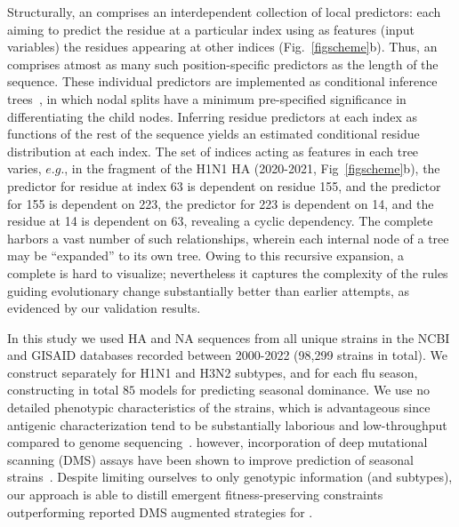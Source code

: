 \documentclass[onecolumn, compsoc,10pt]{IEEEtran}
\begin{document}
Structurally, an \enet comprises an interdependent collection of  local predictors: each aiming to predict the  residue at a particular index  using as features (input variables) the residues appearing  at other  indices  (Fig.~\ref{figscheme}b). Thus,  an \enet comprises atmost as many such  position-specific predictors as the length of the sequence. These individual predictors are implemented as conditional inference trees~\cite{Hothorn06unbiasedrecursive}, in which  nodal splits  have  a minimum pre-specified significance in differentiating the  child nodes. Inferring residue predictors at each  index as  functions of the rest of the sequence  yields an estimated conditional residue distribution  at each index. The set of indices acting as features in each tree varies, $e.g.$, in the fragment of the  H1N1 HA \enet (2020-2021, Fig~\ref{figscheme}b), the predictor for residue at index 63 is dependent on   residue  155, and the predictor for  155 is dependent on  223, the predictor for  223 is dependent on  14, and the residue at  14 is dependent on  63, revealing a cyclic dependency. The complete \enet harbors a vast number of such  relationships, wherein each internal node of a tree may be  ``expanded'' to its own tree. Owing to this recursive expansion,  a complete \enet is hard to visualize; nevertheless it captures the complexity of the rules guiding evolutionary change substantially better than earlier attempts, as evidenced by our validation results.

In this study we used  HA and NA  sequences from  all unique \infl strains in the NCBI and GISAID databases recorded between 2000-2022 (98,299 strains in total). We  construct  separately for H1N1 and H3N2 subtypes, and for each flu season, constructing in total $85$ models for predicting seasonal dominance. %
We use  no detailed phenotypic characteristics of the strains, which is advantageous since antigenic characterization  tend to be substantially  laborious and low-throughput compared to genome sequencing~\cite{wood2012reproducibility}.  however,  incorporation of  deep mutational scanning (DMS) assays  have been shown to improve prediction of seasonal strains~\cite{huddleston2020integrating}. Despite limiting ourselves to only genotypic  information (and subtypes), our approach is able to distill  emergent  fitness-preserving constraints   outperforming reported DMS  augmented strategies for \infl.
\end{document}
